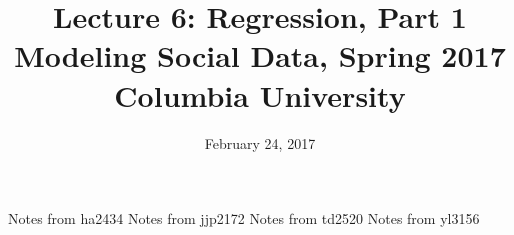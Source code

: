 \documentclass{article}
\title{
Lecture 6: Regression, Part 1 \\  %
Modeling Social Data, Spring 2017 \\   %
Columbia University                    %
}
\date{February 24, 2017}                %
\makeatletter
\let\org@subfile
\renewcommand*{}[1]{%
  \filename@parse{#1}%
  \expandafter
  \graphicspath\expandafter{\expandafter{\filename@area}}%
  \org@subfile{#1}%
}
\makeatother
\begin{document}
\maketitle


\pagebreak \newpage \noindent\Huge{Notes from ha2434} \normalsize \setcounter{section}{0} 
\pagebreak \newpage \noindent\Huge{Notes from jjp2172} \normalsize \setcounter{section}{0} 
\pagebreak \newpage \noindent\Huge{Notes from td2520} \normalsize \setcounter{section}{0} 
\pagebreak \newpage \noindent\Huge{Notes from yl3156} \normalsize \setcounter{section}{0} 
\end{document}
